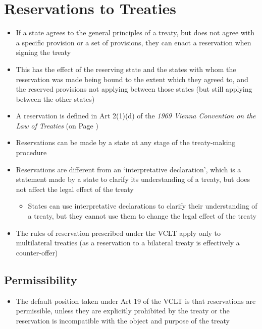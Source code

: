 \section{Reservations to Treaties}
\begin{itemize}
    \item If a state agrees to the general principles of a treaty, but does not agree with a specific provision or a set of provisions, they can enact a reservation when signing the treaty
    \item This has the effect of the reserving state and the states with whom the reservation was made being bound to the extent which they agreed to, and the reserved provisions not applying between those states (but still applying between the other states)
    \item A reservation is defined in Art 2(1)(d) of the \textit{1969 Vienna Convention on the Law of Treaties} (on Page \pageref{VCLT Art 2})
    \item Reservations can be made by a state at any stage of the treaty-making procedure
    \item Reservations are different from an `interpretative declaration', which is a statement made by a state to clarify its understanding of a treaty, but does not affect the legal effect of the treaty
    \begin{itemize}
        \item States can use interpretative declarations to clarify their understanding of a treaty, but they cannot use them to change the legal effect of the treaty
    \end{itemize}
    \item The rules of reservation prescribed under the VCLT apply only to multilateral treaties (as a reservation to a bilateral treaty is effectively a counter-offer)
\end{itemize}

\subsection{Permissibility}
\begin{itemize}
    \item The default position taken under Art 19 of the VCLT is that reservations are permissible, unless they are explicitly prohibited by the treaty or the reservation is incompatible with the object and purpose of the treaty
\end{itemize}

